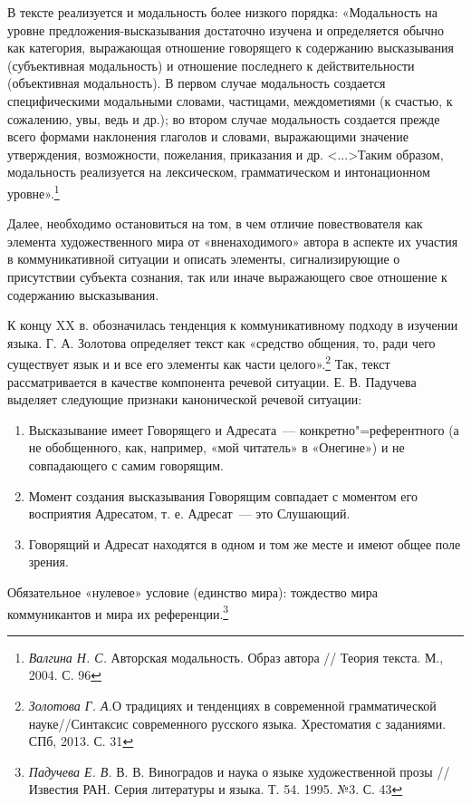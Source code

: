 \documentclass{kursa4}
\begin{document}
      В тексте реализуется и модальность более низкого порядка: «Модальность на уровне предложения-высказывания достаточно изучена и определяется обычно как категория, выражающая отношение говорящего к содержанию высказывания (субъективная модальность) и отношение последнего к действительности (объективная модальность). В первом случае модальность создается специфическими модальными словами, частицами, междометиями (к счастью, к сожалению, увы, ведь и др.); во втором случае модальность создается прежде всего формами наклонения глаголов и словами, выражающими значение утверждения, возможности, пожелания, приказания и др. \textless{}...\textgreater{}Таким образом, модальность реализуется на лексическом, грамматическом и интонационном уровне».\footnote{\textit{{Валгина Н. С. }}{Авторская модальность. Образ автора // Теория текста. М., 2004. С. 96}} 

      Далее, необходимо остановиться на том, в чем отличие повествователя как элемента художественного мира от «вненаходимого» автора в аспекте их участия в коммуникативной ситуации и описать элементы, сигнализирующие о присутствии субъекта сознания, так или иначе выражающего свое отношение к содержанию высказывания. 

      К концу XX в. обозначилась тенденция к коммуникативному подходу в изучении языка. Г. А. Золотова определяет текст как «средство общения, то, ради чего существует язык и и все его элементы как части целого».\footnote{\textit{Золотова Г. А.}О традициях и тенденциях в современной грамматической науке//Синтаксис современного русского языка. Хрестоматия с заданиями. СПб, 2013. С. 31} Так, текст рассматривается в качестве компонента речевой ситуации. \newline
      Е. В. Падучева выделяет следующие признаки канонической речевой ситуации: 

      \begin{enumerate}
      \item Высказывание имеет Говорящего и Адресата~--- конкретно"=референтного (а не обобщенного, как, например, «мой читатель» в «Онегине») и не совпадающего с самим говорящим. 
      \item Момент создания высказывания Говорящим совпадает с моментом его восприятия Адресатом, т. е. Адресат~--- это Слушающий. 
      \item Говорящий и Адресат находятся в одном и том же месте и имеют общее поле зрения. 
      \end{enumerate}
      Обязательное «нулевое» условие (единство мира): тождество мира коммуникантов и мира их референции.\footnote{\textit{Падучева Е. В. }В. В. Виноградов и наука о языке художественной прозы // Известия РАН. Серия литературы и языка. Т. 54. 1995. №3. С. 43} 
\end{document}
